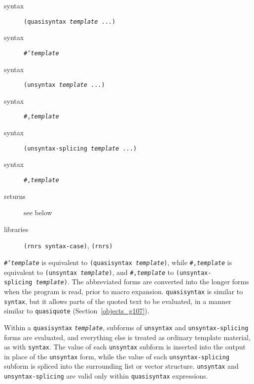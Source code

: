 \begin{description}

\label{syntax_s40}\item[syntax] \texttt{(quasisyntax \textit{template} ...)}



\item[syntax] \texttt{\#{}`\textit{template}}



\item[syntax] \texttt{(unsyntax \textit{template} ...)}



\item[syntax] \texttt{\#{},\textit{template}}



\item[syntax] \texttt{(unsyntax-splicing \textit{template} ...)}



\item[syntax] \texttt{\#{},\@{}\textit{template}}



\item[returns] see below


\item[libraries] \texttt{(rnrs syntax-case)}, \texttt{(rnrs)}
\end{description}

\texttt{\#{}`\textit{template}} is equivalent to \texttt{(quasisyntax \textit{template})},
while
\texttt{\#{},\textit{template}} is equivalent to \texttt{(unsyntax \textit{template})}, and
\texttt{\#{},\@{}\textit{template}} to \texttt{(unsyntax-splicing \textit{template})}.
The abbreviated forms are converted into the longer forms when the program
is read, prior to macro expansion.
\texttt{quasisyntax} is similar to \texttt{syntax}, but it allows parts
of the quoted text to be evaluated, in a manner similar to
\texttt{quasiquote} (Section \ref{objects_g107}).

Within a \texttt{quasisyntax} \texttt{\textit{template}}, subforms of
\texttt{unsyntax} and \texttt{unsyntax-splicing} forms are evaluated,
and everything else is treated as ordinary template material, as
with \texttt{syntax}.
The value of each \texttt{unsyntax} subform is inserted into the output
in place of the \texttt{unsyntax} form, while the value of each
\texttt{unsyntax-splicing} subform is spliced into the surrounding list
or vector structure.
\texttt{unsyntax} and \texttt{unsyntax-splicing} are valid only within
\texttt{quasisyntax} expressions.

